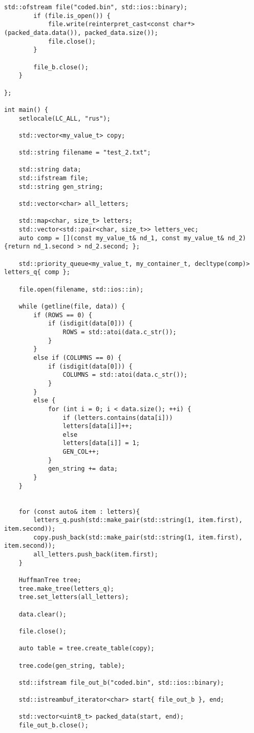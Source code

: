 \begin{lstlisting}[label = list1, caption = Программная реализация описанных алгоритмов]
		std::ofstream file("coded.bin", std::ios::binary);
		if (file.is_open()) {
			file.write(reinterpret_cast<const char*>(packed_data.data()), packed_data.size());
			file.close();
		}
		
		file_b.close();
	}
	
};

int main() {
	setlocale(LC_ALL, "rus");
	
	std::vector<my_value_t> copy;
	
	std::string filename = "test_2.txt";
	
	std::string data;
	std::ifstream file;
	std::string gen_string;
	
	std::vector<char> all_letters;
	
	std::map<char, size_t> letters;
	std::vector<std::pair<char, size_t>> letters_vec;
	auto comp = [](const my_value_t& nd_1, const my_value_t& nd_2) {return nd_1.second > nd_2.second; };
	
	std::priority_queue<my_value_t, my_container_t, decltype(comp)> letters_q{ comp };
	
	file.open(filename, std::ios::in);
	
	while (getline(file, data)) {
		if (ROWS == 0) {
			if (isdigit(data[0])) {
				ROWS = std::atoi(data.c_str());
			}
		}
		else if (COLUMNS == 0) {
			if (isdigit(data[0])) {
				COLUMNS = std::atoi(data.c_str());
			}
		}
		else {
			for (int i = 0; i < data.size(); ++i) {
				if (letters.contains(data[i]))
				letters[data[i]]++;
				else
				letters[data[i]] = 1;
				GEN_COL++;
			}
			gen_string += data;
		}
	}
	
	
	for (const auto& item : letters){
		letters_q.push(std::make_pair(std::string(1, item.first), item.second));
		copy.push_back(std::make_pair(std::string(1, item.first), item.second));
		all_letters.push_back(item.first);
	}
	
	HuffmanTree tree;
	tree.make_tree(letters_q);
	tree.set_letters(all_letters);
	
	data.clear();
	
	file.close();
	
	auto table = tree.create_table(copy);
	
	tree.code(gen_string, table);
	
	std::ifstream file_out_b("coded.bin", std::ios::binary);
	
	std::istreambuf_iterator<char> start{ file_out_b }, end;
	
	std::vector<uint8_t> packed_data(start, end);
	file_out_b.close();
	

\end{lstlisting}
